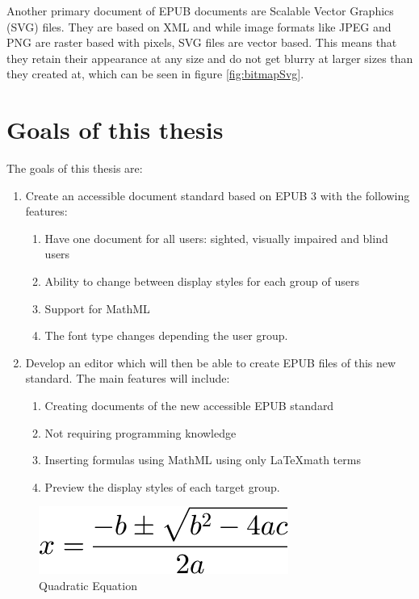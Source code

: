 Another primary document of EPUB documents are Scalable Vector Graphics (SVG) files. They are based on XML and while image formats like JPEG and PNG are raster based with pixels, SVG files are vector based. This means that they retain their appearance at any size and do not get blurry at larger sizes than they created at, which can be seen in figure \ref{fig:bitmapSvg}.


\section{Goals of this thesis}

The goals of this thesis are:

\begin{enumerate}
	\item Create an accessible document standard based on EPUB 3 with the following features:
	\begin{enumerate}
		\item Have one document for all users: sighted, visually impaired and blind users
		\item Ability to change between display styles for each group of users
		\item Support for MathML
		\item The font type changes depending the user group.
	\end{enumerate}
	\item Develop an editor which will then be able to create EPUB files of this new standard. The main features will include:
		\begin{enumerate}
		\item Creating documents of the new accessible EPUB standard 
		\item Not requiring programming knowledge
		\item Inserting formulas using MathML using only \LaTeX math terms
		\item Preview the display styles of each target group. 
	\end{enumerate}
\end{enumerate}

\begin{figure}
	\begin{center}
		\includegraphics[width=\linewidth/3]{figures/QuadraticEquation.png}
	\end{center}
	\caption{Quadratic Equation}
	\label{fig:quadEquaPng}
\end{figure}

